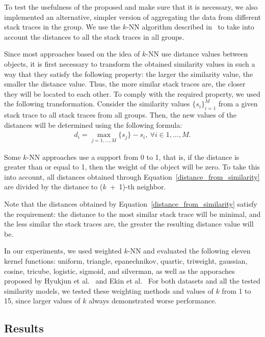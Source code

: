 To test the usefulness of the proposed \ag and make sure that it is necessary, we also implemented an alternative, simpler version of aggregating the data from different stack traces in the group.
We use the $k$-NN algorithm described in~ to take into account the distances to all the stack traces in all groups.

Since most approaches based on the idea of $k$-NN use distance values between objects, it is first necessary to transform the obtained similarity values in such a way that they satisfy the following property: the larger the similarity value, the smaller the distance value.
Thus, the more similar stack traces are, the closer they will be located to each other.
To comply with the required property, we used the following transformation.
Consider the similarity values $\{s_i\}_{i=1}^{M}$ from a given stack trace to all stack traces from all groups.
Then, the new values of the distances will be determined using the following formula:
\begin{gather}
    d_i = \max_{j=1,\ldots,M}\{s_j\} - s_i,\ \forall i \in 1,\ldots,M. 
    \label{distance_from_similarity}
\end{gather}

Some $k$-NN approaches use a support from 0 to 1, that is, if the distance is greater than or equal to 1, then the weight of the object will be zero. To take this into account, all distances obtained through Equation~\ref{distance_from_similarity} are divided by the distance to ($k$~+~1)-th neighbor.

Note that the distances obtained by Equation~\ref{distance_from_similarity} satisfy the requirement: the distance to the most similar stack trace will be minimal, and the less similar the stack traces are, the greater the resulting distance value will be.

In our experiments, we used weighted $k$-NN and evaluated the following eleven kernel functions: uniform, triangle, epanechnikov, quartic, triweight, gaussian, cosine, tricube, logistic, sigmoid, and silverman, as well as the apporaches proposed by Hyukjun et al.~\cite{k_conditional} and Ekin et al.~\cite{distance_based} For both datasets and all the tested similarity models, we tested these weighting methods and values of $k$ from 1 to 15, since larger values of $k$ always demonstrated worse performance. 

\subsection{Results}

